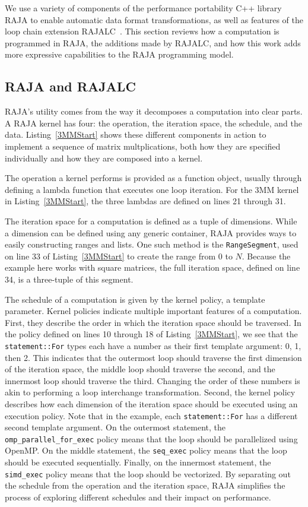 We use a variety of components of the performance portability C++ library RAJA to enable automatic data format transformations, as well as features of the loop chain extension RAJALC~\cite{neth2021inter}. 
This section reviews how a computation is programmed in RAJA, the additions made by RAJALC, and how this work adds more expressive capabilities to the RAJA programming model.

\subsection{RAJA and RAJALC}

RAJA's utility comes from the way it decomposes a computation into clear parts.
A RAJA kernel has four: the operation, the iteration space, the schedule, and the data. 
Listing~\ref{3MMStart} shows these different components in action to implement a sequence of matrix multplications, both how they are specified individually and how they are composed into a kernel.

The operation a kernel performs is provided as a function object, usually through defining a lambda function that executes one loop iteration.
For the 3MM kernel in Listing~\ref{3MMStart}, the three lambdas are defined on lines 21 through 31. 

The iteration space for a computation is defined as a tuple of dimensions.
While a dimension can be defined using any generic container, RAJA provides ways to easily constructing ranges and lists.
One such method is the \verb.RangeSegment., used on line 33 of Listing~\ref{3MMStart} to create the range from $0$ to $N$. 
Because the example here works with square matrices, the full iteration space, defined on line 34, is a three-tuple of this segment. 

The schedule of a computation is given by the kernel policy, a template parameter. 
Kernel policies indicate multiple important features of a computation.
First, they describe the order in which the iteration space should be traversed.
In the policy defined on lines 10 through 18 of Listing~\ref{3MMStart}, we see that the \verb.statement::For. types each have a number as their first template argument: 0, 1, then 2.
This indicates that the outermost loop should traverse the first dimension of the iteration space, the middle loop should traverse the second, and the innermost loop should traverse the third. 
Changing the order of these numbers is akin to performing a loop interchange transformation.
Second, the kernel policy describes how each dimension of the iteration space should be executed using an execution policy.
Note that in the example, each \verb.statement::For. has a different second template argument.
On the outermost statement, the \verb.omp_parallel_for_exec. policy means that the loop should be parallelized using OpenMP. 
On the middle statement, the \verb.seq_exec. policy means that the loop should be executed sequentially.
Finally, on the innermost statement, the \verb.simd_exec. policy means that the loop should be vectorized.
By separating out the schedule from the operation and the iteration space, RAJA simplifies the process of exploring different schedules and their impact on performance.

